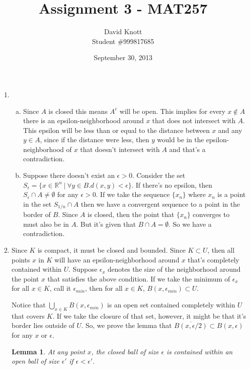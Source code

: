 \documentclass[letterpaper,10pt]{article}
\newtheorem{lemma}[theorem]{Lemma}
\begin{document}
\title{Assignment 3 - MAT257}
\author{David Knott \\  Student \#999817685}
\date{September 30, 2013}
\maketitle
\begin{enumerate}
	\item 
	\begin{enumerate}[a)]
		\item Since $A$ is closed this means $A^c$ will be open. This implies for every $x \notin A$ there is an epsilon-neighborhood around $x$ that does not intersect with $A$. This epsilon will be less than or equal to the distance between $x$ and any $y \in A$, since if the distance were less, then $y$ would be in the epsilon-neighborhood of $x$ that doesn't intersect with $A$ and that's a contradiction.
		\item Suppose there doesn't exist an $\epsilon > 0$. Consider the set $S_\epsilon = \{ x \in \mathbb{R}^n \ \big|\ \forall y \in B. d(x, y) < \epsilon \}$. If there's no epsilon, then $S_\epsilon \cap A \neq \emptyset$ for any $\epsilon > 0$. If we take the sequence $\{ x_n \}$ where $x_n$ is a point in the set $S_{1/n} \cap A$ then we have a convergent sequence to a point in the border of $B$. Since $A$ is closed, then the point that $\{x_n\}$ converges to must also be in $A$. But it's given that $B \cap A = \emptyset$. So we have a contradiction.
	\end{enumerate}
	\item Since $K$ is compact, it must be closed and bounded. Since $K \subset U$, then all points $x$ in $K$ will have an epsilon-neighborhood around $x$ that's completely contained within $U$. Suppose $\epsilon_x$ denotes the size of the neighborhood around the point $x$ that satisfies the above condition. If we take the minimum of $\epsilon_x$ for all $x \in K$, call it $\epsilon_{min}$, then for all $x \in K$, $B(x, \epsilon_{min}) \subset U$.

	Notice that $\bigcup_{x \in K} B(x, \epsilon_{min})$ is an open set contained completely within $U$ that covers $K$. If we take the closure of that set, however, it might be that it's border lies outside of $U$. So, we prove the lemma that $\overline{B(x, \epsilon/2)} \subset B(x, \epsilon)$ for any $x$ or $\epsilon$.
	
	\begin{lemma}
		\label{ClosedBallInOpen}
		At any point $x$, the closed ball of size $\epsilon$ is contained within an open ball of size $\epsilon'$ if $\epsilon < \epsilon'$.
	\end{lemma}


\end{enumerate}
\end{document}
